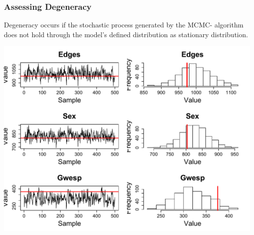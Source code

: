 \documentclass[xcolor=dvipsnames]{beamer}
\begin{document}
\begin{frame}
\frametitle{Assessing Degeneracy}
Degeneracy occurs if the stochastic process generated by the MCMC- algorithm does not hold through the model’s defined distribution as stationary distribution.
\begin{center}
\includegraphics[scale=.4]{degeneracy_presentation} 
\end{center}
\end{frame}
\end{document}
